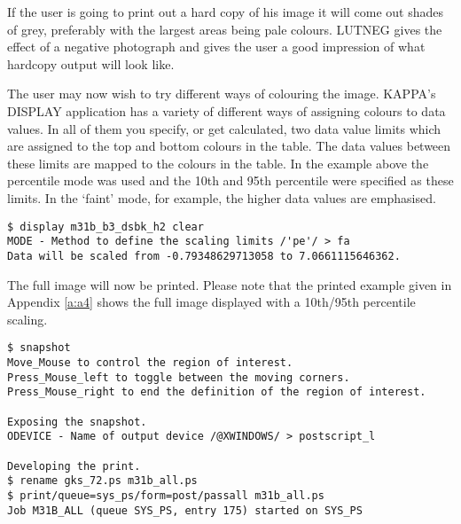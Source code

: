 If the user is going to print out a hard copy of his image it will come out
shades of grey, preferably with the largest areas being pale colours. LUTNEG
gives the effect of a negative photograph and gives the user a good impression
of what hardcopy output will look like.

The user may now wish to try different ways of colouring the image. KAPPA's
DISPLAY application has a variety of different ways of assigning colours to
data values. In all of them you specify, or get calculated, two data value
limits which are assigned to the top and bottom colours in the table. The data 
values between these limits are mapped to the colours in the table. In the
example above the  percentile mode was used and the 10th and
95th percentile were specified as these limits. In the `faint' mode, for
example, the higher data values are emphasised.

\begin{small}
\begin{verbatim}
$ display m31b_b3_dsbk_h2 clear
MODE - Method to define the scaling limits /'pe'/ > fa
Data will be scaled from -0.79348629713058 to 7.0661115646362.
\end{verbatim}
\end{small}

The full image will now be printed. Please note that the printed example given
in Appendix \ref{a:a4} shows the full image displayed with a 10th/95th
percentile scaling.

\begin{small}
\begin{verbatim}
$ snapshot
Move_Mouse to control the region of interest.
Press_Mouse_left to toggle between the moving corners.
Press_Mouse_right to end the definition of the region of interest.

Exposing the snapshot.
ODEVICE - Name of output device /@XWINDOWS/ > postscript_l

Developing the print.
$ rename gks_72.ps m31b_all.ps
$ print/queue=sys_ps/form=post/passall m31b_all.ps
Job M31B_ALL (queue SYS_PS, entry 175) started on SYS_PS
\end{verbatim}
\end{small}

